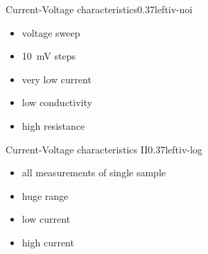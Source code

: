 \documentclass[hyperref={pdfpagelabels=false}, aspectratio=43, t]{beamer}  %
\begin{document}
\begin{graphicsFrame}{Current-Voltage characteristics}{}{0.37}{left}{iv-noi}{}
	\vspace{2em}
	\begin{itemize}
		\item voltage sweep
		\vspace{.5em}
		\item \SI{10}{\milli\volt} steps
		\vspace{.5em}
		\item very low current 
		\vspace{.5em}
		\item low conductivity 
		\vspace{.5em}
		\item high resistance 
	\end{itemize}
\end{graphicsFrame}
\begin{graphicsFrame}{Current-Voltage characteristics II}{}{0.37}{left}{iv-log}{}
	\vspace{2em}
	\begin{itemize}
		\item all measurements of single sample
		\vspace{.5em}
		\item huge range 
		\vspace{.5em}
		\item low current
		\vspace{.5em}
		\item high current
	\end{itemize}
\end{graphicsFrame}
\end{document}
